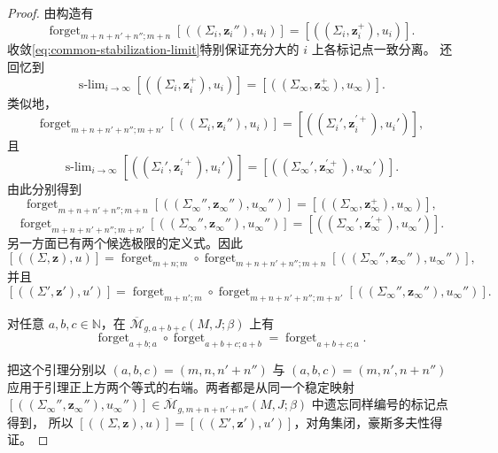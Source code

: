 \begin{proof}
由构造有
\[
 \operatorname{forget}_{m+n+n'+n'';m+n}
 [((\Sigma_i,\boldsymbol z_i''),u_i)]
 =[((\Sigma_i,\boldsymbol z_i^+),u_i)].
\]
收敛\eqref{eq:common-stabilization-limit}特别保证充分大的 $i$ 上各标记点一致分离。
还回忆到
\[
 \operatorname{s-lim}_{i\to\infty}
 [((\Sigma_i,\boldsymbol z_i^+),u_i)]
 =[((\Sigma_\infty,\boldsymbol z_\infty^+),u_\infty)].
\]
类似地，
\[
 \operatorname{forget}_{m+n+n'+n'';m+n'}
 [((\Sigma_i,\boldsymbol z_i''),u_i)]
 =[((\Sigma_i',\boldsymbol z_i^{\prime+}),u_i')],
\]
且
\[
 \operatorname{s-lim}_{i\to\infty}
 [((\Sigma_i',\boldsymbol z_i^{\prime+}),u_i')]
 =[((\Sigma_\infty',\boldsymbol z_\infty^{\prime+}),u_\infty')].
\]
由此分别得到
\[
 \operatorname{forget}_{m+n+n'+n'';m+n}
 [((\Sigma_\infty'',\boldsymbol z_\infty''),u_\infty'')]
 =[((\Sigma_\infty,\boldsymbol z_\infty^+),u_\infty)],
\]
\[
 \operatorname{forget}_{m+n+n'+n'';m+n'}
 [((\Sigma_\infty'',\boldsymbol z_\infty''),u_\infty'')]
 =[((\Sigma_\infty',\boldsymbol z_\infty^{\prime+}),u_\infty')].
\]
另一方面已有两个候选极限的定义式。因此
\[
 [((\Sigma,\boldsymbol z),u)]
 =\operatorname{forget}_{m+n;m}\circ
 \operatorname{forget}_{m+n+n'+n'';m+n}
 [((\Sigma_\infty'',\boldsymbol z_\infty''),u_\infty'')],
\]
并且
\[
 [((\Sigma',\boldsymbol z'),u')]
 =\operatorname{forget}_{m+n';m}\circ
 \operatorname{forget}_{m+n+n'+n'';m+n'}
 [((\Sigma_\infty'',\boldsymbol z_\infty''),u_\infty'')].
\]

\begin{lemma}\label{lem:composition-forgetful-stable-maps}
对任意 $a,b,c\in\mathbb N$，在
$\overline{\mathcal M}_{g,a+b+c}(M,J;\beta)$ 上有
\[
 \operatorname{forget}_{a+b;a}\circ
 \operatorname{forget}_{a+b+c;a+b}
 =\operatorname{forget}_{a+b+c;a}.
\]
\end{lemma}

把这个引理分别以 $(a,b,c)=(m,n,n'+n'')$ 与
$(a,b,c)=(m,n',n+n'')$ 应用于引理正上方两个等式的右端。两者都是从同一个稳定映射
$[((\Sigma_\infty'',\boldsymbol z_\infty''),u_\infty'')]
\in\overline{\mathcal M}_{g,m+n+n'+n''}(M,J;\beta)$ 中遗忘同样编号的标记点得到，
所以
$[((\Sigma,\boldsymbol z),u)]=[((\Sigma',\boldsymbol z'),u')]$，对角集闭，豪斯多夫性得证。
\end{proof}
